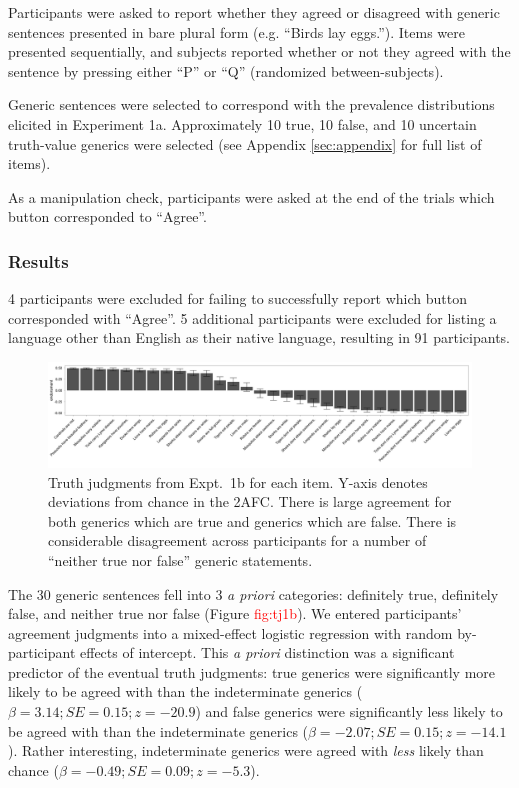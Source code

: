 \documentclass[10pt,letterpaper]{article}
\newcommand{\red}[1]{\textcolor{Red}{#1}}
\begin{document}
Participants were asked to report whether they agreed or disagreed with generic sentences presented in bare plural form (e.g. ``Birds lay eggs.''). 
Items were presented sequentially, and subjects reported whether or not they agreed with the sentence by pressing either ``P'' or ``Q'' (randomized between-subjects). 

Generic sentences were selected to correspond with the prevalence distributions elicited in Experiment 1a. 
Approximately 10 true, 10 false, and 10 uncertain truth-value generics were selected (see Appendix \ref{sec:appendix} for full list of items).

As a manipulation check, participants were asked at the end of the trials which button corresponded to ``Agree''.

\subsubsection{Results}

4 participants were excluded for failing to successfully report which button corresponded with ``Agree''. 
5 additional participants were excluded for listing a language other than English as their native language, resulting in 91 participants.


\begin{figure}
\centering
    \includegraphics[width=\columnwidth]{truhtjudge_n100}
    \caption{Truth judgments from Expt.~1b for each item. Y-axis denotes deviations from chance in the 2AFC. There is large agreement for both generics which are true and generics which are false. There is considerable disagreement across participants for a number of ``neither true nor false'' generic statements. }
  \label{fig:tj1b}
\end{figure}


The 30 generic sentences fell into 3 \emph{a priori} categories: definitely true, definitely false, and neither true nor false (Figure \red{fig:tj1b}). We entered participants' agreement judgments into a mixed-effect logistic regression with random by-participant effects of intercept. This \emph{a priori} distinction was a significant predictor of the eventual truth judgments: true generics were significantly more likely to be agreed with than the indeterminate generics ($\beta = 3.14; SE = 0.15; z = -20.9$) and false generics were significantly less likely to be agreed with than the indeterminate generics ($\beta = -2.07; SE = 0.15; z = -14.1$). Rather interesting, indeterminate generics were agreed with \emph{less} likely than chance ($\beta = -0.49; SE = 0.09; z = -5.3$).
\end{document}
